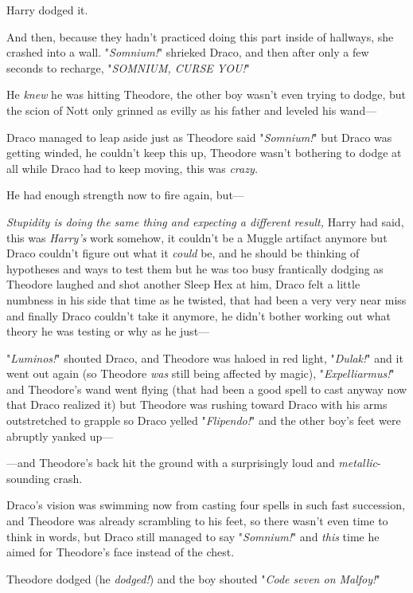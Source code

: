 Harry dodged it.

And then, because they hadn't practiced doing this part inside of hallways, she 
crashed into a wall.
\sbreak
"\emph{Somnium!}" shrieked Draco, and then after only a few seconds to 
recharge, "\emph{SOMNIUM, CURSE YOU!}"

He \emph{knew} he was hitting Theodore, the other boy wasn't even trying to 
dodge, but the scion of Nott only grinned as evilly as his father and leveled 
his wand---

Draco managed to leap aside just as Theodore said "\emph{Somnium!}" but Draco 
was getting winded, he couldn't keep this up, Theodore wasn't bothering to 
dodge at all while Draco had to keep moving, this was \emph{crazy.}

He had enough strength now to fire again, but---

\emph{Stupidity is doing the same thing and expecting a different result,} 
Harry had said, this was \emph{Harry's} work somehow, it couldn't be a Muggle 
artifact anymore but Draco couldn't figure out what it \emph{could} be, and he 
should be thinking of hypotheses and ways to test them but he was too busy 
frantically dodging as Theodore laughed and shot another Sleep Hex at him, 
Draco felt a little numbness in his side that time as he twisted, that had been 
a very very near miss and finally Draco couldn't take it anymore, he didn't 
bother working out what theory he was testing or why as he just---

"\emph{Luminos!}" shouted Draco, and Theodore was haloed in red light, 
"\emph{Dulak!}" and it went out again (so Theodore \emph{was} still being 
affected by magic), "\emph{Expelliarmus!}" and Theodore's wand went flying 
(that had been a good spell to cast anyway now that Draco realized it) but 
Theodore was rushing toward Draco with his arms outstretched to grapple so 
Draco yelled "\emph{Flipendo!}" and the other boy's feet were abruptly yanked 
up---

---and Theodore's back hit the ground with a surprisingly loud and 
\emph{metallic}-sounding crash.

Draco's vision was swimming now from casting four spells in such fast 
succession, and Theodore was already scrambling to his feet, so there wasn't 
even time to think in words, but Draco still managed to say "\emph{Somnium!}" 
and \emph{this} time he aimed for Theodore's face instead of the chest.

Theodore dodged (he \emph{dodged!}) and the boy shouted "\emph{Code seven on 
Malfoy!}"


